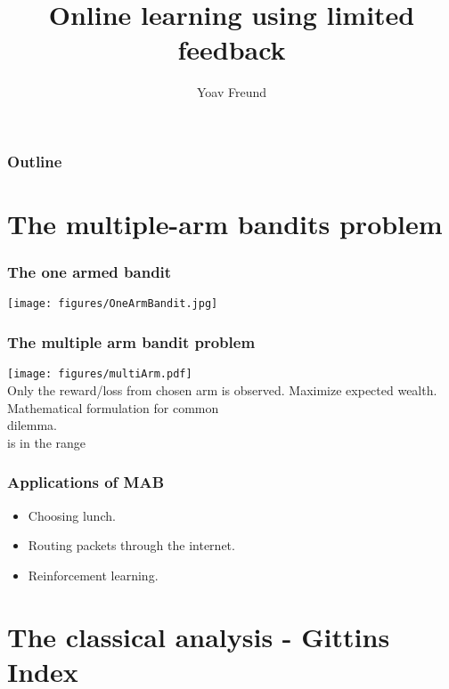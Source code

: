 \documentclass{beamer}
\title [Multi-arm Bandits] %
{Online learning using limited feedback}
\author[Freund] %
{Yoav Freund}
\institute[Universities of Somewhere and Elsewhere] %
\begin{document}
\iffalse %
\fi %

\begin{frame}
  \titlepage
\end{frame}

\begin{frame}
  \frametitle{Outline}
  \tableofcontents[pausesections]
\end{frame}

\section{The multiple-arm bandits problem}

\begin{frame}
\frametitle{The one armed bandit}
\texttt{[image: figures/OneArmBandit.jpg]}
\end{frame}


\begin{frame}
\frametitle{The multiple arm bandit problem}
\texttt{[image: figures/multiArm.pdf]}
\\
\pause
{} Only the reward/loss from chosen arm is observed.
\pause
{} Maximize expected wealth.\\
\pause
Mathematical formulation for common \\
 dilemma.\\
\pause
{} is in the range \R{$[0,1]$}
\end{frame}

\begin{frame}
\frametitle{Applications of MAB}
\begin{itemize}
\item Choosing lunch.
\item Routing packets through the internet.
\item Reinforcement learning.
\end{itemize}
\end{frame}


\section{The classical analysis - Gittins Index}
\end{document}
